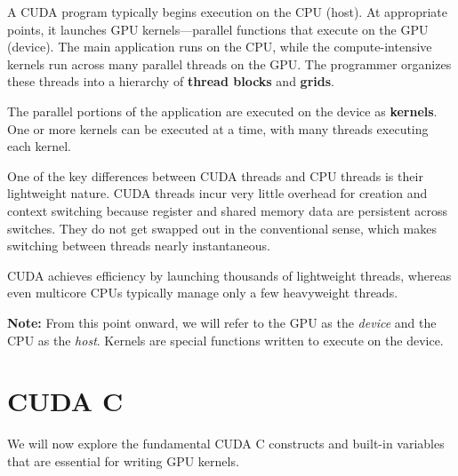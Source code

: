 \documentclass[12pt]{book}
\begin{document}
A CUDA program typically begins execution on the CPU (host). At appropriate points, it launches GPU kernels—parallel functions that execute on the GPU (device). The main application runs on the CPU, while the compute-intensive kernels run across many parallel threads on the GPU. The programmer organizes these threads into a hierarchy of \textbf{thread blocks} and \textbf{grids}.

The parallel portions of the application are executed on the device as \textbf{kernels}. One or more kernels can be executed at a time, with many threads executing each kernel.

One of the key differences between CUDA threads and CPU threads is their lightweight nature. CUDA threads incur very little overhead for creation and context switching because register and shared memory data are persistent across switches. They do not get swapped out in the conventional sense, which makes switching between threads nearly instantaneous.

CUDA achieves efficiency by launching thousands of lightweight threads, whereas even multicore CPUs typically manage only a few heavyweight threads.

\textbf{Note:} From this point onward, we will refer to the GPU as the \emph{device} and the CPU as the \emph{host}. Kernels are special functions written to execute on the device.

\section{CUDA C}
We will now explore the fundamental CUDA C constructs and built-in variables that are essential for writing GPU kernels.
\end{document}
